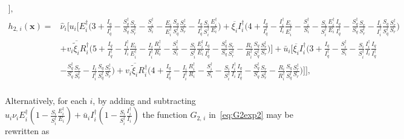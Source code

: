 \documentclass[a4paper]{article}
\begin{document}
\begin{align}
\Bigg],
\\h_{2,\,i}(\mathbf x)=& \hat\nu_i\Bigg[u_i\Big[E^\dagger _i \Big(3 + \frac{I_q}{I^\dagger_q} - \frac{S^\dagger _q}{S_q}\frac{S_r}{S^\dagger _r} -\frac{S^\dagger _i}{S_i} -\frac{E_i}{E^\dagger _i} \frac{S_q}{S^\dagger _q}\frac{S^\dagger _r}{S_r}-\frac{I_q}{I^\dagger_q} \frac{S_i}{S^\dagger_i} \frac{E^\dagger_i}{E_i}\Big) + \overline{\xi_i} I^\dagger _i\Big(4+\frac{I_q}{I^\dagger _q}- \frac{I^\dagger_i}{I_i}\frac{E_i}{E^\dagger_i}-\frac{S^\dagger _i}{S_i}-\frac{S_i}{S^\dagger _i}\frac{E^\dagger _i}{E_i}\frac{I_q}{I^\dagger _q}-\frac{S^\dagger _q}{S_q}\frac{S_r}{S^\dagger _r}-\frac{I_i}{I^\dagger _i}\frac{S_q}{S^\dagger _q}\frac{S^\dagger _r}{S_r}\Big)\nonumber\\& + v_i\overline{\widetilde\xi_i}R^\dagger_i\Big(5+\frac{I_q}{I^\dagger _q}- \frac{I^\dagger_i}{I_i}\frac{E_i}{E^\dagger_i}-\frac{I_i}{I^\dagger_i}\frac{R^\dagger_i}{R_i}-\frac{S^\dagger _i}{S_i}-\frac{S_i}{S^\dagger _i}\frac{E^\dagger _i}{E_i}\frac{I_q}{I^\dagger _q}-\frac{S^\dagger _q}{S_q}\frac{S_r}{S^\dagger _r}-\frac{R_i}{R^\dagger _i}\frac{S_q}{S^\dagger _q}\frac{S^\dagger _r}{S_r}\Big)\Big] + \bar u_i\Big[\overline{\xi_i} I^\dagger _i\Big(3+\frac{I_q}{I^\dagger _q}- \frac{S^\dagger _i}{S_i}-\frac{S_i}{S^\dagger _i}\frac{I^\dagger _i}{I_i}\frac{I_q}{I^\dagger _q}\nonumber\\&-\frac{S^\dagger _q}{S_q}\frac{S_r}{S^\dagger _r}-\frac{I_i}{I^\dagger _i}\frac{S_q}{S^\dagger _q}\frac{S^\dagger _r}{S_r}\Big) + v_i\overline{\widetilde\xi_i}R^\dagger_i\Big(4+\frac{I_q}{I^\dagger _q}- \frac{I_i}{I^\dagger_i}\frac{R^\dagger_i}{R_i}-\frac{S^\dagger _i}{S_i}-\frac{S_i}{S^\dagger _i}\frac{I^\dagger _i}{I_i}\frac{I_q}{I^\dagger _q}-\frac{S^\dagger _q}{S_q}\frac{S_r}{S^\dagger _r}-\frac{R_i}{R^\dagger _i}\frac{S_q}{S^\dagger _q}\frac{S^\dagger _r}{S_r}\Big)\Big]\Bigg],
\end{align}
\begin{align}
\end{align}

\noindent Alternatively, for each $i$, by adding and subtracting $u_i\nu_iE^\dagger _i \left( 1-\frac{S_i}{S^\dagger _i}\frac{E^\dagger _i}{E_i} \right) + \bar u_iI^\dagger _i \left( 1-\frac{S_i}{S^\dagger _i}\frac{I^\dagger _i}{I_i} \right)$ the function $G_{2,\,i}$ in~\eqref{eq:G2exp2}  may be rewritten as
\end{document}

